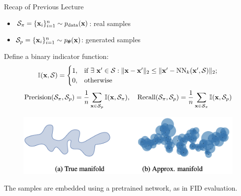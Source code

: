 \documentclass{beamer}
\begin{document}
\begin{frame}{Recap of Previous Lecture}
	\vspace{-0.2cm}
	\begin{itemize}
		\item $\mathcal{S}_{\pi} = \{\mathbf{x}_i\}_{i=1}^{n} \sim p_{\text{data}}(\mathbf{x})$: real samples
		\item $\mathcal{S}_{p} = \{\mathbf{x}_i\}_{i=1}^{n} \sim p_{\boldsymbol{\theta}}(\mathbf{x})$: generated samples
	\end{itemize}
	Define a binary indicator function:
	\vspace{-0.2cm}
	\[
		\mathbb{I}(\mathbf{x}, \mathcal{S}) = 
		\begin{cases}
			1, & \text{if}~ \exists~ \mathbf{x}' \in \mathcal{S}: \| \mathbf{x}  - \mathbf{x}'\|_2 \leq \| \mathbf{x}' - \text{NN}_k(\mathbf{x}', \mathcal{S})\|_2; \\
			0, & \text{otherwise}
		\end{cases}
	\]
	\vspace{-0.3cm}
	\[
		\text{Precision} (\mathcal{S}_{\pi}, \mathcal{S}_{p}) = \frac{1}{n} \sum_{\mathbf{x} \in \mathcal{S}_{p}} \mathbb{I}(\mathbf{x}, \mathcal{S}_{\pi}),
		\quad
		\text{Recall} (\mathcal{S}_{\pi}, \mathcal{S}_{p}) = \frac{1}{n} \sum_{\mathbf{x} \in \mathcal{S}_{\pi}} \mathbb{I}(\mathbf{x}, \mathcal{S}_{p})
	\]
	\vspace{-0.7cm}
	\begin{figure}
		\includegraphics[width=0.75\linewidth]{figs/pr_k_nearest}
	\end{figure}
	\vspace{-0.3cm}
	The samples are embedded using a pretrained network, as in FID evaluation.
\end{frame}
\end{document}
